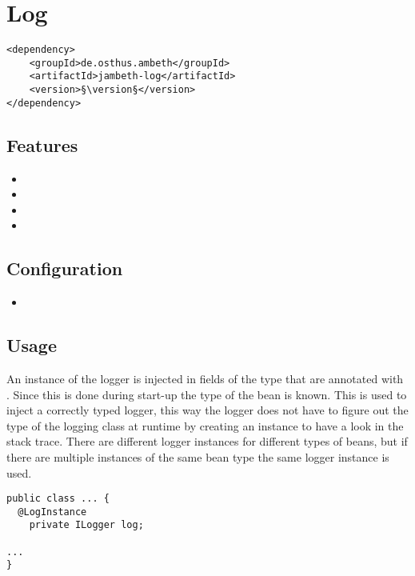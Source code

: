 \section{Log}
\label{module:Log}
\ClearAPI
\TODO
\begin{lstlisting}[style=POM,caption={Maven modules to use \emph{Ambeth Log}}]
<dependency>
	<groupId>de.osthus.ambeth</groupId>
	<artifactId>jambeth-log</artifactId>
	<version>§\version§</version>
</dependency>
\end{lstlisting}
\subsection{Features}
\begin{itemize}
	\item {}
	\item {}
	\item {}
	\item {}
\end{itemize}

\subsection{Configuration}
\begin{itemize}
	\item {}
\end{itemize}

\subsection{Usage}
An instance of the \AMBETH logger is injected in fields of the type  that are annotated with . Since this is done during start-up the type of the bean is known. This is used to inject a correctly typed logger, this way the logger does not have to figure out the type of the logging class at runtime by creating an  instance to have a look in the stack trace. There are different logger instances for different types of beans, but if there are multiple instances of the same bean type the same logger instance is used.

\begin{lstlisting}[style=Java,caption={Example of a logger injection field}]
public class ... {
  @LogInstance
	private ILogger log;

...
}
\end{lstlisting}
